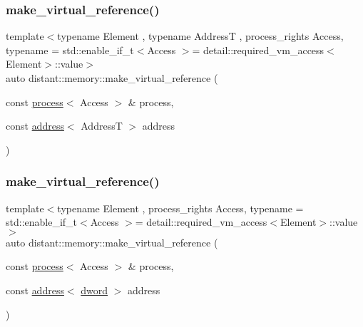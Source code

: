 \mbox{\label{namespacedistant_1_1memory_abd3c8f39450cad344c08cd8036efc2d7}} 
\subsubsection{\texorpdfstring{make\+\_\+virtual\+\_\+reference()}{make\_virtual\_reference()}\hspace{0.1cm}{\footnotesize\ttfamily [1/2]}}
{\footnotesize\ttfamily template$<$typename Element , typename AddressT , process\+\_\+rights Access, typename  = std\+::enable\+\_\+if\+\_\+t$<$\+Access $>$= detail\+::required\+\_\+vm\+\_\+access$<$\+Element$>$\+::value$>$ \\
auto distant\+::memory\+::make\+\_\+virtual\+\_\+reference (\begin{DoxyParamCaption}\item[{const \mbox{\hyperlink{classdistant_1_1kernel__objects_1_1process}{process}}$<$ Access $>$ \&}]{process,  }\item[{const \mbox{\hyperlink{classdistant_1_1memory_1_1address}{address}}$<$ AddressT $>$}]{address }\end{DoxyParamCaption})\hspace{0.3cm}{\ttfamily [noexcept]}}

\mbox{\label{namespacedistant_1_1memory_af20ac6e74d8e00e996bfa16048ae36e2}} 
\subsubsection{\texorpdfstring{make\+\_\+virtual\+\_\+reference()}{make\_virtual\_reference()}\hspace{0.1cm}{\footnotesize\ttfamily [2/2]}}
{\footnotesize\ttfamily template$<$typename Element , process\+\_\+rights Access, typename  = std\+::enable\+\_\+if\+\_\+t$<$\+Access $>$= detail\+::required\+\_\+vm\+\_\+access$<$\+Element$>$\+::value$>$ \\
auto distant\+::memory\+::make\+\_\+virtual\+\_\+reference (\begin{DoxyParamCaption}\item[{const \mbox{\hyperlink{classdistant_1_1kernel__objects_1_1process}{process}}$<$ Access $>$ \&}]{process,  }\item[{const \mbox{\hyperlink{classdistant_1_1memory_1_1address}{address}}$<$ \mbox{\hyperlink{namespacedistant_a9fa41a5a1a17dcbd24da1c1855c92489}{dword}} $>$}]{address }\end{DoxyParamCaption})\hspace{0.3cm}{\ttfamily [noexcept]}}


